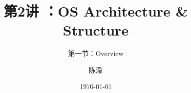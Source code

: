 


\title[第1讲]{第2讲 ：OS Architecture \& Structure} %
\subtitle{第一节：Overview }
\author{陈渝} %
\date{\today} %




\begin{frame}
\titlepage %
\end{frame}

